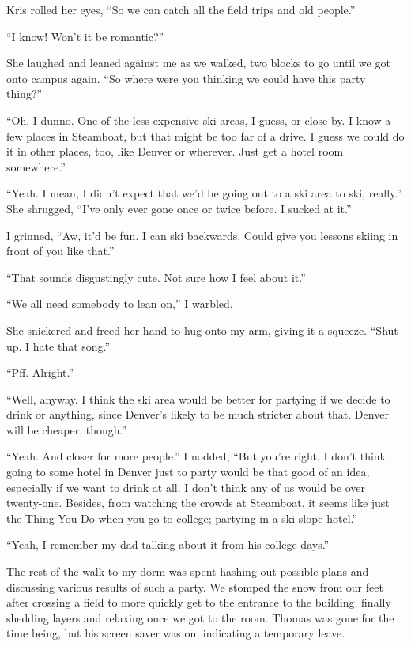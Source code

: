 Kris rolled her eyes, ``So we can catch all the field trips and old people.''

``I know!  Won't it be romantic?''

She laughed and leaned against me as we walked, two blocks to go until we got onto campus again.  ``So where were you thinking we could have this party thing?''

``Oh, I dunno.  One of the less expensive ski areas, I guess, or close by.  I know a few places in Steamboat, but that might be too far of a drive.  I guess we could do it in other places, too, like Denver or wherever.  Just get a hotel room somewhere.''

``Yeah.  I mean, I didn't expect that we'd be going out to a ski area to ski, really.''  She shrugged, ``I've only ever gone once or twice before.  I sucked at it.''

I grinned, ``Aw, it'd be fun.  I can ski backwards.  Could give you lessons skiing in front of you like that.''

``That sounds disgustingly cute.  Not sure how I feel about it.''

``We all need somebody to lean on,'' I warbled.

She snickered and freed her hand to hug onto my arm, giving it a squeeze.  ``Shut up.  I hate that song.''

``Pff.  Alright.''

``Well, anyway.  I think the ski area would be better for partying if we decide to drink or anything, since Denver's likely to be much stricter about that.  Denver will be cheaper, though.''

``Yeah.  And closer for more people.''  I nodded, ``But you're right.  I don't think going to some hotel in Denver just to party would be that good of an idea, especially if we want to drink at all.  I don't think any of us would be over twenty-one.  Besides, from watching the crowds at Steamboat, it seems like just the Thing You Do when you go to college; partying in a ski slope hotel.''

``Yeah, I remember my dad talking about it from his college days.''

The rest of the walk to my dorm was spent hashing out possible plans and discussing various results of such a party.  We stomped the snow from our feet after crossing a field to more quickly get to the entrance to the building, finally shedding layers and relaxing once we got to the room.  Thomas was gone for the time being, but his screen saver was on, indicating a temporary leave.

